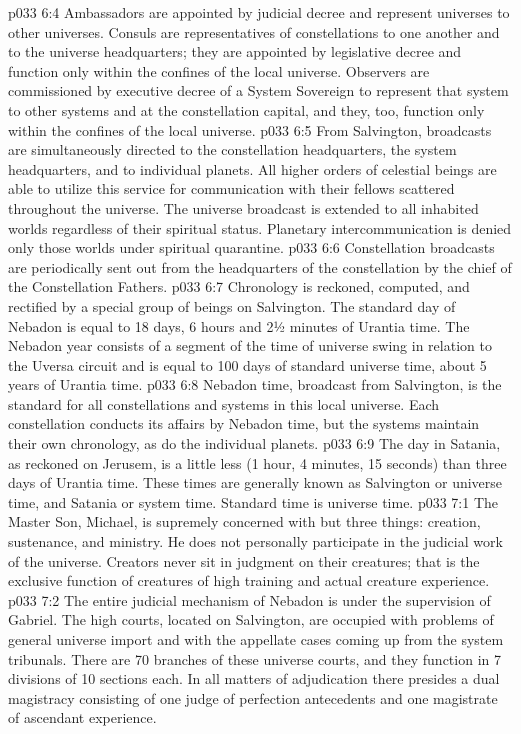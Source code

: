 \vs p033 6:4 \pc Ambassadors are appointed by judicial decree and represent universes to other universes. Consuls are representatives of constellations to one another and to the universe headquarters; they are appointed by legislative decree and function only within the confines of the local universe. Observers are commissioned by executive decree of a System Sovereign to represent that system to other systems and at the constellation capital, and they, too, function only within the confines of the local universe.
\vs p033 6:5 \pc From Salvington, broadcasts are simultaneously directed to the constellation headquarters, the system headquarters, and to individual planets. All higher orders of celestial beings are able to utilize this service for communication with their fellows scattered throughout the universe. The universe broadcast is extended to all inhabited worlds regardless of their spiritual status. Planetary intercommunication is denied only those worlds under spiritual quarantine.
\vs p033 6:6 Constellation broadcasts are periodically sent out from the headquarters of the constellation by the chief of the Constellation Fathers.
\vs p033 6:7 \pc Chronology is reckoned, computed, and rectified by a special group of beings on Salvington. The standard day of Nebadon is equal to 18 days, 6 hours and 2½ minutes of Urantia time. The Nebadon year consists of a segment of the time of universe swing in relation to the Uversa circuit and is equal to 100 days of standard universe time, about 5 years of Urantia time.
\vs p033 6:8 Nebadon time, broadcast from Salvington, is the standard for all constellations and systems in this local universe. Each constellation conducts its affairs by Nebadon time, but the systems maintain their own chronology, as do the individual planets.
\vs p033 6:9 The day in Satania, as reckoned on Jerusem, is a little less (1 hour, 4 minutes, 15 seconds) than three days of Urantia time. These times are generally known as Salvington or universe time, and Satania or system time. Standard time is universe time.
\vs p033 7:1 The Master Son, Michael, is supremely concerned with but three things: creation, sustenance, and ministry. He does not personally participate in the judicial work of the universe. Creators never sit in judgment on their creatures; that is the exclusive function of creatures of high training and actual creature experience.
\vs p033 7:2 The entire judicial mechanism of Nebadon is under the supervision of Gabriel. The high courts, located on Salvington, are occupied with problems of general universe import and with the appellate cases coming up from the system tribunals. There are 70 branches of these universe courts, and they function in 7 divisions of 10 sections each. In all matters of adjudication there presides a dual magistracy consisting of one judge of perfection antecedents and one magistrate of ascendant experience.
